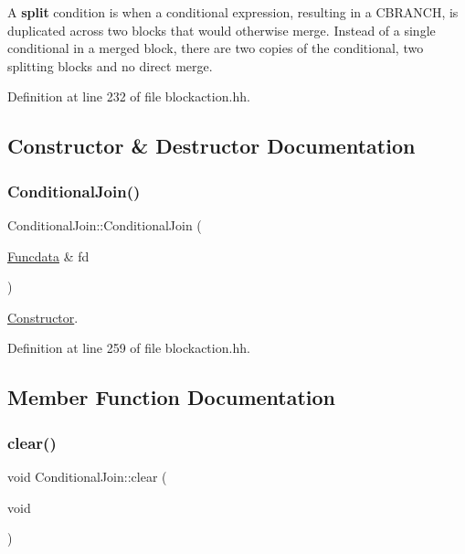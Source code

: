 A {\bfseries{split}} condition is when a conditional expression, resulting in a C\+B\+R\+A\+N\+CH, is duplicated across two blocks that would otherwise merge. Instead of a single conditional in a merged block, there are two copies of the conditional, two splitting blocks and no direct merge. 

Definition at line 232 of file blockaction.\+hh.



\subsection{Constructor \& Destructor Documentation}
\mbox{\label{class_conditional_join_a92106a1507dac5ae066ab3acec324eb2}} 
\subsubsection{\texorpdfstring{ConditionalJoin()}{ConditionalJoin()}}
{\footnotesize\ttfamily Conditional\+Join\+::\+Conditional\+Join (\begin{DoxyParamCaption}\item[{\mbox{\hyperlink{class_funcdata}{Funcdata}} \&}]{fd }\end{DoxyParamCaption})\hspace{0.3cm}{\ttfamily [inline]}}



\mbox{\hyperlink{class_constructor}{Constructor}}. 



Definition at line 259 of file blockaction.\+hh.



\subsection{Member Function Documentation}
\mbox{\label{class_conditional_join_a9e69ebb78367803c598edfdc5ef04f5a}} 
\subsubsection{\texorpdfstring{clear()}{clear()}}
{\footnotesize\ttfamily void Conditional\+Join\+::clear (\begin{DoxyParamCaption}\item[{void}]{ }\end{DoxyParamCaption})}



